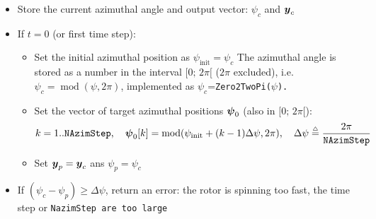 \documentclass[11pt]{article}
\begin{document}
\begin{itemize}
\begin{itemize}
            \item Store the current azimuthal angle and output vector: $\psi_{c}$ and $\boldsymbol{y}_c$
            \item If $t=0$ (or first time step):
                \begin{itemize}\tightlist
                    \item Set the initial azimuthal position as $\psi_\text{init}=\psi_c$
                        The azimuthal angle is stored as a number in the interval $[0;\, 2\pi [$ ($2\pi$ excluded), i.e. $\psi_c=\operatorname{mod}(\psi, 2\pi)$, implemented as $\psi_c$=\tt{Zero2TwoPi($\psi$)}.
                    \item Set the vector of target azimuthal positions $\boldsymbol{\psi}_0$ (also in $[0;\,2\pi[$):
                            \begin{align}
                                 k=1..\tt{NAzimStep}
                                 ,\quad
                                 \v{\psi}_0[k] = \operatorname{mod}(\psi_\text{init} +  (k-1) \Delta\psi, 2\pi), \quad \Delta\psi\eqdef \frac{2\pi}{\tt{NAzimStep}}
                            \end{align}

                    \item Set $\boldsymbol{y}_p=\boldsymbol{y}_c$ ans $\psi_p=\psi_c$
                \end{itemize}

            \item If $(\psi_c -\psi_p) \geq \Delta\psi$, return an error: the rotor is spinning too fast, the time step or \tt{NazimStep} are too large


\end{itemize}
\end{itemize}
\end{document}
